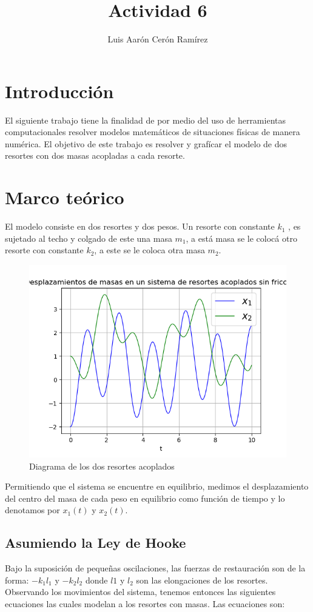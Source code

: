 \documentclass{article}
\title{Actividad 6}
\author{Luis Aarón Cerón Ramírez}
\begin{document}
\maketitle
\section{Introducción}
El siguiente trabajo tiene la finalidad de por medio del uso de herramientas computacionales resolver modelos matemáticos de situaciones físicas de manera numérica. El objetivo de este trabajo es resolver y grafícar el modelo de dos resortes con dos masas acopladas a cada resorte.

\section{Marco teórico}
El modelo consiste en dos resortes y dos pesos. Un resorte con constante $k_1$ , es sujetado al techo y colgado de este una masa $m_1$, a está masa se le colocá otro resorte con constante $k_2$, a este se le coloca otra masa $m_2$.

\begin{figure}
\centering
\includegraphics[scale=0.3]{two_springs.png}
\caption{Diagrama de los dos resortes acoplados}
\label{figure: Resortes acoplados }
\end{figure}

Permitiendo que el sistema se encuentre en equilibrio, medimos el desplazamiento del centro del masa de cada peso en equilibrio como función de tiempo y lo denotamos por $x_1(t)$ y $x_2(t)$.

\subsection{Asumiendo la Ley de Hooke}
Bajo la suposición de pequeñas oscilaciones, las fuerzas de restauración son de la forma:
\newline
$-k_1l_1$ y $-k_2l_2$
\newline
donde $l1$ y $l_2$ son las elongaciones de los resortes.
\newline
Observando los movimientos del sistema, tenemos entonces las siguientes ecuaciones las cuales modelan a los resortes con masas. Las ecuaciones son:
\end{document}
